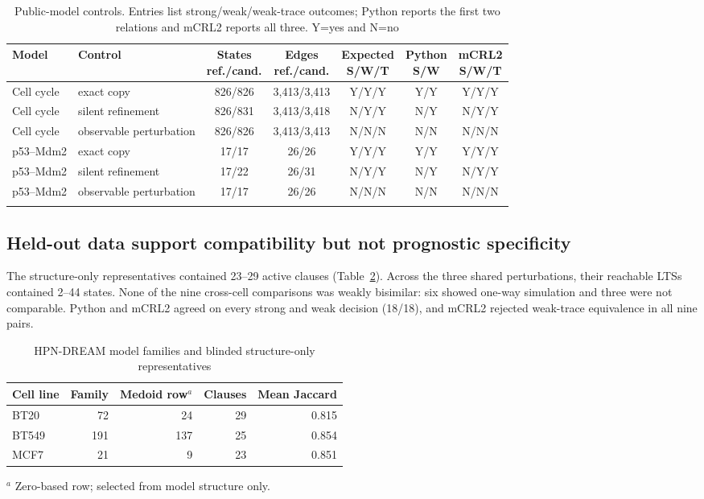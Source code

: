 \documentclass[pdflatex,sn-mathphys-ay]{sn-jnl}
\theoremstyle{definition}
\begin{document}
\begin{table}[t]
\caption{Public-model controls. Entries list strong/weak/weak-trace outcomes;
Python reports the first two relations and mCRL2 reports all three. Y=yes and
N=no}\label{tab:public-controls}
\centering
\scriptsize
\setlength{\tabcolsep}{3pt}
\begin{tabular*}{\textwidth}{@{\extracolsep{\fill}}llccccc}
\toprule
Model & Control & \shortstack{States\\ref./cand.} & \shortstack{Edges\\ref./cand.} & \shortstack{Expected\\S/W/T} & \shortstack{Python\\S/W} & \shortstack{mCRL2\\S/W/T} \\
\midrule
Cell cycle & exact copy & 826/826 & 3,413/3,413 & Y/Y/Y & Y/Y & Y/Y/Y \\
Cell cycle & silent refinement & 826/831 & 3,413/3,418 & N/Y/Y & N/Y & N/Y/Y \\
Cell cycle & observable perturbation & 826/826 & 3,413/3,413 & N/N/N & N/N & N/N/N \\
p53--Mdm2 & exact copy & 17/17 & 26/26 & Y/Y/Y & Y/Y & Y/Y/Y \\
p53--Mdm2 & silent refinement & 17/22 & 26/31 & N/Y/Y & N/Y & N/Y/Y \\
p53--Mdm2 & observable perturbation & 17/17 & 26/26 & N/N/N & N/N & N/N/N \\
\botrule
\end{tabular*}
\end{table}

\subsection{Held-out data support compatibility but not prognostic specificity}
\label{sec:hpn-results}

The structure-only representatives contained 23--29 active clauses
(Table~\ref{tab:hpn-medoids}). Across the three shared perturbations, their
reachable LTSs contained 2--44 states. None of the nine cross-cell comparisons
was weakly bisimilar: six showed one-way simulation and three were not comparable.
Python and mCRL2 agreed on every strong and weak decision (18/18), and mCRL2
rejected weak-trace equivalence in all nine pairs.

\begin{table}[t]
\caption{HPN-DREAM model families and blinded structure-only representatives}
\label{tab:hpn-medoids}
\centering
\small
\begin{tabular}{lrrrr}
\toprule
Cell line & Family & Medoid row$^a$ & Clauses & Mean Jaccard \\
\midrule
BT20  & 72  & 24  & 29 & 0.815 \\
BT549 & 191 & 137 & 25 & 0.854 \\
MCF7  & 21  & 9   & 23 & 0.851 \\
\bottomrule
\end{tabular}
\par\smallskip
\raggedright\footnotesize $^a$ Zero-based row; selected from model structure only.
\end{table}
\end{document}
